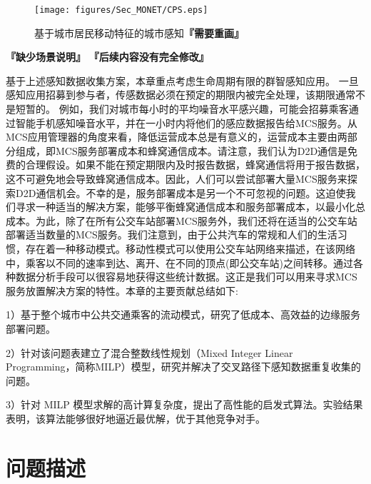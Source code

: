 \begin{figure}[!h]
\centering
\texttt{[image: figures/Sec\_MONET/CPS.eps]}
\vspace{-0.5em}
\caption{基于城市居民移动特征的城市感知\textbf{『需要重画』}}
\label{Figure_edge}
\end{figure}

\textbf{『缺少场景说明』}
\textbf{『后续内容没有完全修改』}

基于上述感知数据收集方案，本章重点考虑生命周期有限的群智感知应用。
一旦感知应用招募到参与者，传感数据必须在预定的期限内被完全处理，该期限通常不是短暂的。
例如，我们对城市每小时的平均噪音水平感兴趣，可能会招募乘客通过智能手机感知噪音水平，并在一小时内将他们的感应数据报告给MCS服务。从MCS应用管理器的角度来看，降低运营成本总是有意义的，运营成本主要由两部分组成，即MCS服务部署成本和蜂窝通信成本。请注意，我们认为D2D通信是免费的合理假设。如果不能在预定期限内及时报告数据，蜂窝通信将用于报告数据，这不可避免地会导致蜂窝通信成本。因此，人们可以尝试部署大量MCS服务来探索D2D通信机会。不幸的是，服务部署成本是另一个不可忽视的问题。这迫使我们寻求一种适当的解决方案，能够平衡蜂窝通信成本和服务部署成本，以最小化总成本。为此，除了在所有公交车站部署MCS服务外，我们还将在适当的公交车站部署适当数量的MCS服务。我们注意到，由于公共汽车的常规和人们的生活习惯，存在着一种移动模式。移动性模式可以使用公交车站网络来描述，在该网络中，乘客以不同的速率到达、离开、在不同的顶点(即公交车站)之间转移。通过各种数据分析手段可以很容易地获得这些统计数据。这正是我们可以用来寻求MCS服务放置解决方案的特性。本章的主要贡献总结如下:

1）基于整个城市中公共交通乘客的流动模式，研究了低成本、高效益的边缘服务部署问题。

2）针对该问题表建立了混合整数线性规划（Mixed Integer Linear Programming，简称MILP）模型，研究并解决了交叉路径下感知数据重复收集的问题。

3）针对 MILP 模型求解的高计算复杂度，提出了高性能的启发式算法。实验结果表明，该算法能够很好地逼近最优解，优于其他竞争对手。



\section{问题描述}

